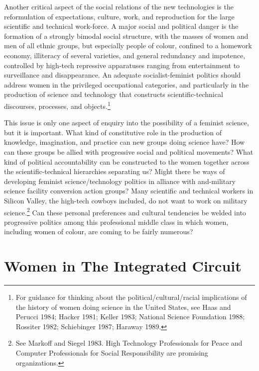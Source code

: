 \documentclass[DIV=12,%
               BCOR=10mm,%
               headinclude=false,%
               footinclude=false,open=any,%
               fontsize=11pt,%
               twoside,%
               paper=210mm:11in]%
               {scrbook}
\newcommand*{\Slash}{\slash\hspace{0pt}}
\begin{document}
Another critical aspect of the social relations of the new technologies is the reformulation of expectations, culture, work, and reproduction for the large scientific and technical work-force. A major social and political danger is the formation of a strongly bimodal social structure, with the masses of women and men of all ethnic groups, but especially people of colour, confined to a homework economy, illiteracy of several varieties, and general redundancy and impotence, controlled by high-tech repressive apparatuses ranging from entertainment to surveillance and disappearance. An adequate socialist-feminist politics should address women in the privileged occupational categories, and particularly in the production of science and technology that constructs scientific-technical discourses, processes, and objects.\footnote{For guidance for thinking about the political\Slash{}cultural\Slash{}racial implications of the history of women doing science in the United States, see Haas and Perucci 1984; Hacker 1981; Keller 1983; National Science Foundation 1988; Rossiter 1982; Schiebinger 1987; Haraway 1989.}


This issue is only one aspect of enquiry into the possibility of a feminist science, but it is important. What kind of constitutive role in the production of knowledge, imagination, and practice can new groups doing science have? How can these groups be allied with progressive social and political movements? What kind of political accountability can be constructed to the women together across the scientific-technical hierarchies separating us? Might there be ways of developing feminist science\Slash{}technology politics in alliance with and-military science facility conversion action groups? Many scientific and technical workers in Silicon Valley, the high-tech cowboys included, do not want to work on military science.\footnote{See Markoff and Siegel 1983. High Technology Professionals for Peace and Computer Professionals for Social Responsibility are promising organizations.} Can these personal preferences and cultural tendencies be welded into progressive politics among this professional middle class in which women, including women of colour, are coming to be fairly numerous?

\chapter{Women in The Integrated Circuit}
\end{document}
